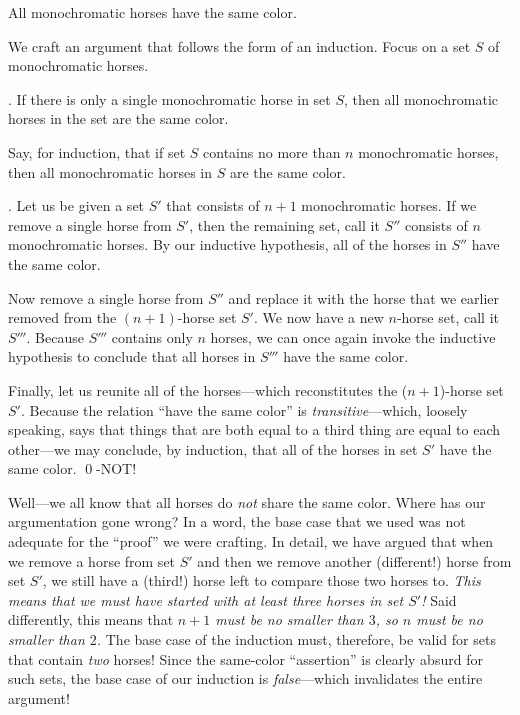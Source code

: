 All monochromatic horses have the same color.

\smallskip

We craft an argument that follows the form of an induction.  Focus on a set $S$ of monochromatic horses.

\smallskip

.
If there is only a single monochromatic horse in set $S$, then all monochromatic horses in the set are the same color.

\smallskip

Say, for induction, that if set $S$ contains no more than $n$ monochromatic horses, then all monochromatic horses in $S$ are the same color.

\smallskip

.
Let us be given a set $S'$ that consists of $n+1$ monochromatic horses.  If we remove a single 
horse from $S'$, then the remaining set, call it $S''$ consists of $n$ monochromatic horses.  By our inductive hypothesis, all of the horses in $S''$ have the same color.

Now remove a single horse from $S''$ and replace it with the horse that we earlier removed from the $(n+1)$-horse set $S'$.  We now have a new $n$-horse set, call it $S'''$.  Because $S'''$ contains only $n$ horses, we can once again invoke the inductive hypothesis to conclude that all horses in $S'''$ have the same color.

\smallskip

Finally, let us reunite all of the horses---which reconstitutes the ($n+1$)-horse set $S'$.  Because the relation ``have the same color'' is {\em transitive}---which, loosely speaking, says that things that are both equal to a third thing are equal to each other---we may conclude, by induction, that all of the horses in set $S'$ have the same color.  \qed-NOT!

\medskip

Well---we all know that all horses do {\em not} share the same color.  Where has our argumentation gone wrong?  In a word, the base case that we used was not adequate for the ``proof'' we were crafting.  In detail, we have argued that when we remove a horse from set $S'$ and then we remove another (different!) horse from set $S'$, we still have a (third!) horse left to compare those two horses to.  {\em This means that we must have started with at least {\em three} horses in set $S'$!}  Said differently, this means that {\em $n+1$ must be no smaller than $3$, so $n$ must be no smaller than $2$.}  The base case of the induction must, therefore, be valid for sets that contain {\em two} horses!  Since the same-color ``assertion'' is clearly absurd for such sets, the base case of our induction is {\em false}---which invalidates the entire argument!

